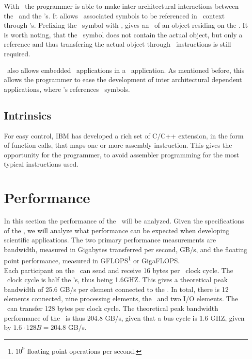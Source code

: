 With \CESOF\ the programmer is able to make inter architectural
interactions between the \PPU\ and the \SPE{}'s. It allows \PPE\
associated symbols to be referenced in \SPE\ context
through \EAR{}'s. Prefixing the \SPE\ symbol with ,
gives an \EA\ of an object residing on the \PPE{}. It is worth noting,
that the \EAR\ symbol does not contain the actual object, but only a
reference and thus transfering the actual object through \DMA\
instructions is still required\cite{ibm_ABI}.

\CESOF\ also allows embedded \SPE\ applications in a \PPU\
application. As mentioned before, this allows the programmer to ease
the development of inter architectural dependent applications,
where \SPE{}'s references \PPU\ symbols.

\subsection{Intrinsics}
\label{sec:intrinsics}

For easy control, IBM has developed a rich set of C/C++ extension, in
the form of function calls, that maps one or more assembly
instruction. This gives the opportunity for the programmer, to avoid
assembler programming for the most typical instructions used.

\section{Performance}
\label{sec:cellperformance}

In this section the performance of the \CBE\ will be analyzed. Given
the specifications of the \CBE{}, we will analyze what performance can
be expected when developing scientific applications. The two primary
performance measurements are bandwidth, measured in Gigabytes
transferred per second, GB/s, and the floating point performance,
measured in GFLOPS\footnote{$10^9$ floating point operations per
second.} or GigaFLOPS.\\

Each participant on the \EIB\ can send and receive 16 bytes per \EIB\
clock cycle. The \EIB\ clock cycle is half the \PPE{}'s, thus being
1.6GHZ. This gives a theoretical peak bandwidth of 25.6 GB/s per
element connected to the \EIB{}. In total, there is 12 elements
connected, nine processing elements, the \MIC\ and two I/O
elements. The \EIB\ can transfer 128 bytes per clock cycle. The
theoretical peak bandwidth performance of the \EIB\ is thus 204.8
GB/s, given that a bus cycle is 1.6 GHZ, given by $1.6 \cdot 128 B =
204.8$ GB/s\cite{ibm_cell_network}.

